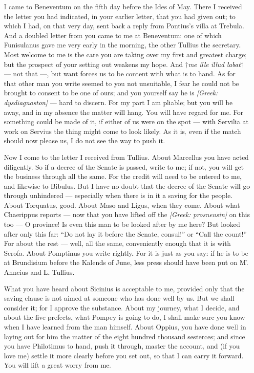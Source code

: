 

 I came to Beneventum on the fifth day before the Ides of May. There I received the letter you had indicated, in your earlier letter, that you had given out; to which I had, on that very day, sent back a reply from Pontius's villa at Trebula. And a doubled letter from you came to me at Beneventum: one of which Funisulanus gave me very early in the morning, the other Tullius the secretary. Most welcome to me is the care you are taking over my first and greatest charge; but the prospect of your setting out weakens my hope. And \textit{$\dagger$me ille illud labat$\dagger$} --- not that ---, but want forces us to be content with what is to hand. As for that other man you write seemed to you not unsuitable, I fear he could not be brought to consent to be one of ours; and you yourself say he is \textit{[Greek: dysdiagnoston]} --- hard to discern. For my part I am pliable; but you will be away, and in my absence the matter will hang. You will have regard for me. For something could be made of it, if either of us were on the spot --- with Servilia at work on Servius the thing might come to look likely. As it is, even if the match should now please us, I do not see the way to push it.

 Now I come to the letter I received from Tullius. About Marcellus you have acted diligently. So if a decree of the Senate is passed, write to me; if not, you will get the business through all the same. For the credit will need to be entered to me, and likewise to Bibulus. But I have no doubt that the decree of the Senate will go through unhindered --- especially when there is in it a saving for the people. About Torquatus, good. About Maso and Ligus, when they come. About what Chaerippus reports --- now that you have lifted off the \textit{[Greek: prosneusin]} on this too --- O province! Is even this man to be looked after by me here? But looked after only this far: ``Do not lay it before the Senate, consul!'' or ``Call the count!'' For about the rest --- well, all the same, conveniently enough that it is with Scrofa. About Pomptinus you write rightly. For it is just as you say: if he is to be at Brundisium before the Kalends of June, less press should have been put on M'. Anneius and L. Tullius.

 What you have heard about Sicinius is acceptable to me, provided only that the saving clause is not aimed at someone who has done well by us. But we shall consider it; for I approve the substance. About my journey, what I decide, and about the five prefects, what Pompey is going to do, I shall make sure you know when I have learned from the man himself. About Oppius, you have done well in laying out for him the matter of the eight hundred thousand sesterces; and since you have Philotimus to hand, push it through, master the account, and (if you love me) settle it more clearly before you set out, so that I can carry it forward. You will lift a great worry from me.

